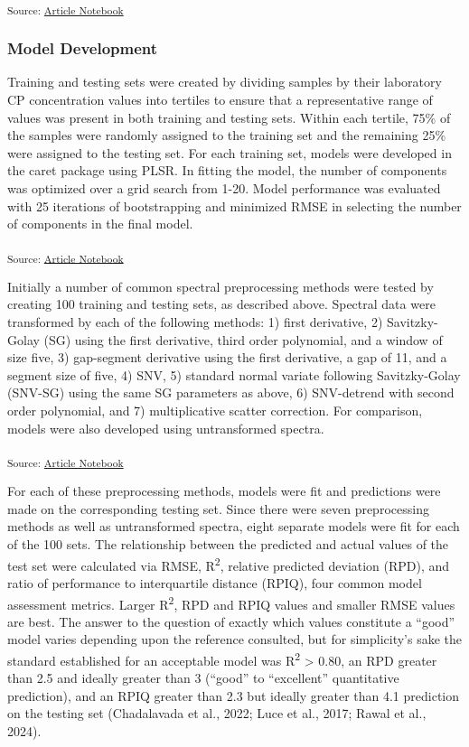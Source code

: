 \documentclass[
]{agujournal2019}
\begin{document}
\textsubscript{Source:
\href{https://rvcrawford.github.io/glowing-system/index.qmd.html}{Article
Notebook}}

\subsubsection{Model Development}\label{model-development}

Training and testing sets were created by dividing samples by their
laboratory CP concentration values into tertiles to ensure that a
representative range of values was present in both training and testing
sets. Within each tertile, 75\% of the samples were randomly assigned to
the training set and the remaining 25\% were assigned to the testing
set. For each training set, models were developed in the caret package
using PLSR. In fitting the model, the number of components was optimized
over a grid search from 1-20. Model performance was evaluated with 25
iterations of bootstrapping and minimized RMSE in selecting the number
of components in the final model.

\textsubscript{Source:
\href{https://rvcrawford.github.io/glowing-system/index.qmd.html}{Article
Notebook}}

Initially a number of common spectral preprocessing methods were tested
by creating 100 training and testing sets, as described above. Spectral
data were transformed by each of the following methods: 1) first
derivative, 2) Savitzky-Golay (SG) using the first derivative, third
order polynomial, and a window of size five, 3) gap-segment derivative
using the first derivative, a gap of 11, and a segment size of five, 4)
SNV, 5) standard normal variate following Savitzky-Golay (SNV-SG) using
the same SG parameters as above, 6) SNV-detrend with second order
polynomial, and 7) multiplicative scatter correction. For comparison,
models were also developed using untransformed spectra.

\textsubscript{Source:
\href{https://rvcrawford.github.io/glowing-system/index.qmd.html}{Article
Notebook}}

For each of these preprocessing methods, models were fit and predictions
were made on the corresponding testing set. Since there were seven
preprocessing methods as well as untransformed spectra, eight separate
models were fit for each of the 100 sets. The relationship between the
predicted and actual values of the test set were calculated via RMSE,
R\textsuperscript{2}, relative predicted deviation (RPD), and ratio of
performance to interquartile distance (RPIQ), four common model
assessment metrics. Larger R\textsuperscript{2}, RPD and RPIQ values and
smaller RMSE values are best. The answer to the question of exactly
which values constitute a ``good'' model varies depending upon the
reference consulted, but for simplicity's sake the standard established
for an acceptable model was R\textsuperscript{2} \textgreater{} 0.80, an
RPD greater than 2.5 and ideally greater than 3 (``good'' to
``excellent'' quantitative prediction), and an RPIQ greater than 2.3 but
ideally greater than 4.1 prediction on the testing set (Chadalavada et
al., 2022; Luce et al., 2017; Rawal et al., 2024).
\end{document}
